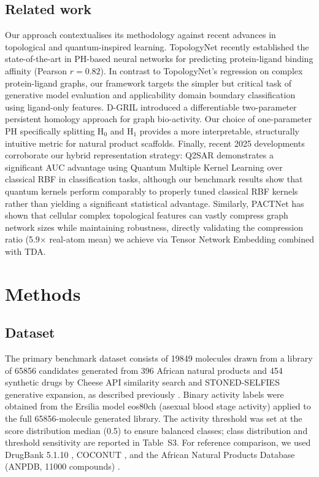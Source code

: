 \documentclass[11pt,a4paper]{article}
\begin{document}
\subsection{Related work}

Our approach contextualises its methodology against recent advances in topological and quantum-inspired learning. TopologyNet \citep{topologynet_2018} recently established the state-of-the-art in PH-based neural networks for predicting protein-ligand binding affinity (Pearson $r = 0.82$). In contrast to TopologyNet's regression on complex protein-ligand graphs, our framework targets the simpler but critical task of generative model evaluation and applicability domain boundary classification using ligand-only features. D-GRIL \citep{dgril_2026} introduced a differentiable two-parameter persistent homology approach for graph bio-activity. Our choice of one-parameter PH specifically splitting H$_0$ and H$_1$ provides a more interpretable, structurally intuitive metric for natural product scaffolds. Finally, recent 2025 developments corroborate our hybrid representation strategy: Q2SAR \citep{q2sar_2025} demonstrates a significant AUC advantage using Quantum Multiple Kernel Learning over classical RBF in classification tasks, although our benchmark results show that quantum kernels perform comparably to properly tuned classical RBF kernels rather than yielding a significant statistical advantage. Similarly, PACTNet \citep{pactnet_2025} has shown that cellular complex topological features can vastly compress graph network sizes while maintaining robustness, directly validating the compression ratio (\num{5.9}$\times$ real-atom mean) we achieve via Tensor Network Embedding combined with TDA.


\section{Methods}

\subsection{Dataset}

The primary benchmark dataset consists of \num{19849} molecules drawn from a library of \num{65856} candidates generated from 396 African natural products and 454 synthetic drugs by Cheese API similarity search and STONED-SELFIES generative expansion, as described previously \citep{temgoua2026antimalarial}. Binary activity labels were obtained from the Ersilia model eos80ch (asexual blood stage activity) applied to the full \num{65856}-molecule generated library. The activity threshold was set at the score distribution median (0.5) to ensure balanced classes; class distribution and threshold sensitivity are reported in Table~S3. For reference comparison, we used DrugBank 5.1.10 \citep{drugbank_2018}, COCONUT \citep{coconut_2021}, and the African Natural Products Database (ANPDB, \num{11000} compounds) \citep{anpdb_2026}.
\end{document}
